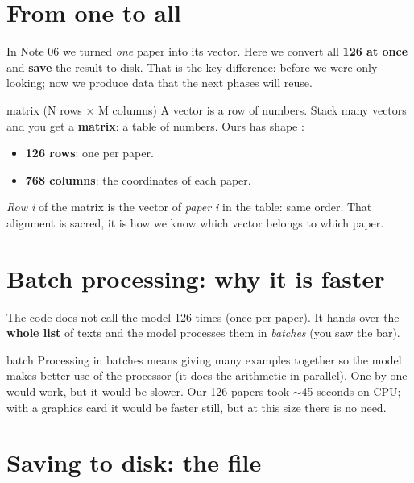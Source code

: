 \documentclass[11pt,a4paper]{article}
\begin{document}

\section{From one to all}

In Note 06 we turned \emph{one} paper into its vector. Here we convert all \textbf{126 at
once} and \textbf{save} the result to disk. That is the key difference: before we were only
looking; now we produce data that the next phases will reuse.

\begin{concepto}{matrix (N rows $\times$ M columns)}
A vector is a row of numbers. Stack many vectors and you get a \textbf{matrix}: a table of
numbers. Ours has shape :
\begin{itemize}
  \item \textbf{126 rows}: one per paper.
  \item \textbf{768 columns}: the coordinates of each paper.
\end{itemize}
\emph{Row i} of the matrix is the vector of \emph{paper i} in the table: same order. That
alignment is sacred, it is how we know which vector belongs to which paper.
\end{concepto}

\section{Batch processing: why it is faster}

The code does not call the model 126 times (once per paper). It hands over the \textbf{whole
list} of texts and the model processes them in \emph{batches} (you saw the
 bar).

\begin{concepto}{batch}
Processing in batches means giving many examples together so the model makes better use of
the processor (it does the arithmetic in parallel). One by one would work, but it would be
slower. Our 126 papers took $\sim$45 seconds on CPU; with a graphics card it would be faster
still, but at this size there is no need.
\end{concepto}

\section{Saving to disk: the  file}
\end{document}
